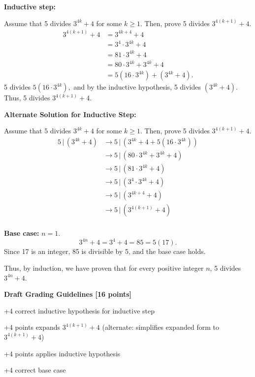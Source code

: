 \documentclass[12pt]{exam}
\begin{document}
\begin{solution}
\textbf{Inductive step:}

Assume that 5 divides $3^{4k} + 4$ for some $k\geq{1}$. Then, prove 5 divides $3^{4(k + 1)} + 4$.
\begin{align*}
    3^{4(k + 1)} + 4 & = 3^{4k + 4} + 4 \\
    &= 3^4 \cdot 3^{4k} + 4 \\
    &= 81\cdot 3^{4k} + 4 \\
    &= 80\cdot 3^{4k} + 3^{4k} + 4 \\
    &= 5(16\cdot 3^{4k}) + (3^{4k}+4).
\end{align*}
5 divides $5(16\cdot 3^{4k}),$ and by the inductive hypothesis, 5 divides $(3^{4k} + 4)$. Thus, 5 divides $3^{4(k + 1)} + 4$.

\textbf{Alternate Solution for Inductive Step:}

Assume that 5 divides $3^{4k} + 4$ for some $k\geq{1}$. Then, prove 5 divides $3^{4(k + 1)} + 4.$
\begin{align*}
    5 \,|\, (3^{4k} + 4) &\rightarrow 5 \,|\, (3^{4k} + 4 + 5(16\cdot 3^{4k}))\\
    & \rightarrow 5 \,|\, (80\cdot3^{4k} + 3^{4k} + 4)\\
    & \rightarrow 5 \,|\, (81\cdot3^{4k} + 4)\\
    & \rightarrow 5 \,|\, (3^{4}\cdot3^{4k} + 4)\\
    & \rightarrow 5 \,|\, (3^{4k + 4} + 4)\\
    & \rightarrow 5 \,|\, (3^{4(k + 1)} + 4)\\
\end{align*}

\textbf{Base case:} $n = 1$.
$$3^{4n} + 4 = 3^4 + 4 = 85 = 5(17).$$
Since 17 is an integer, 85 is divisible by 5, and the base case holds.

Thus, by induction, we have proven that for every positive integer $n$, 5 divides $3^{4n} + 4$.

\textbf{Draft Grading Guidelines [16 points]}
\begin{guidelines}
    \item +4 correct inductive hypothesis for inductive step
    \item +4 points expands $3^{4(k+1)} + 4$ (alternate: simplifies expanded form to $3^{4(k+1)} + 4$)
    \item +4 points applies inductive hypothesis
    \item +4 correct base case
\end{guidelines}
\end{solution}
\end{document}
